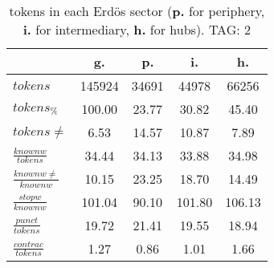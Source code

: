\begin{table}[h!]
\begin{center}
\begin{tabular}{| l || c | c | c | c |}\hline
 & {\bf g.} & {\bf p.} & {\bf i.} & {\bf h.} \\\hline\hline
$tokens$ & 145924  & 34691  & 44978  & 66256 \\
$tokens_{\%}$ & 100.00  & 23.77  & 30.82  & 45.40 \\
$tokens \neq$ & 6.53  & 14.57  & 10.87  & 7.89 \\\hline
$\frac{knownw}{tokens}$ & 34.44  & 34.13  & 33.88  & 34.98 \\
$\frac{knownw \neq}{knownw}$ & 10.15  & 23.25  & 18.70  & 14.49 \\\hline
$\frac{stopw}{knownw}$ & 101.04  & 90.10  & 101.80  & 106.13 \\
$\frac{punct}{tokens}$ & 19.72  & 21.41  & 19.55  & 18.94 \\
$\frac{contrac}{tokens}$ & 1.27  & 0.86  & 1.01  & 1.66 \\\hline
\end{tabular}
\caption{tokens in each Erd\"os sector ({{\bf p.}} for periphery, {{\bf i.}} for intermediary, 
    {{\bf h.}} for hubs). TAG: 2}
\end{center}
\end{table}